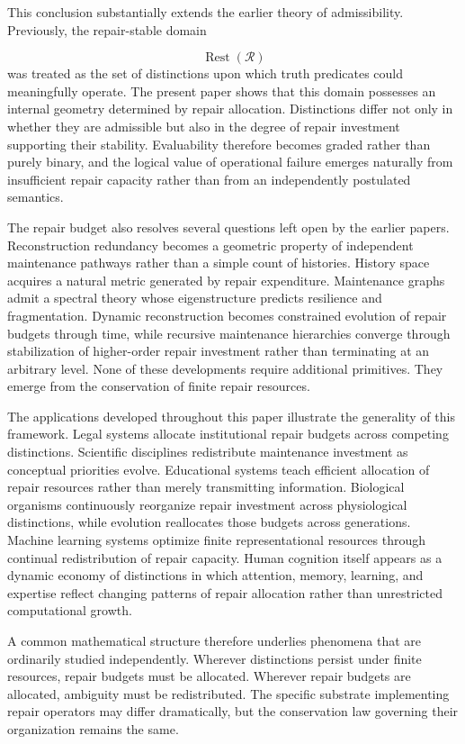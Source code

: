 \documentclass[12pt,oneside]{article}
\theoremstyle{plain}
\theoremstyle{definition}
\theoremstyle{remark}
\DeclareMathOperator{\Rest}{Rest}
\begin{document}
This conclusion substantially extends the earlier theory of admissibility. Previously, the repair-stable domain

\[
\Rest(\mathcal R)
\]
was treated as the set of distinctions upon which truth predicates could meaningfully operate. The present paper shows that this domain possesses an internal geometry determined by repair allocation. Distinctions differ not only in whether they are admissible but also in the degree of repair investment supporting their stability. Evaluability therefore becomes graded rather than purely binary, and the logical value of operational failure emerges naturally from insufficient repair capacity rather than from an independently postulated semantics.

The repair budget also resolves several questions left open by the earlier papers. Reconstruction redundancy becomes a geometric property of independent maintenance pathways rather than a simple count of histories. History space acquires a natural metric generated by repair expenditure. Maintenance graphs admit a spectral theory whose eigenstructure predicts resilience and fragmentation. Dynamic reconstruction becomes constrained evolution of repair budgets through time, while recursive maintenance hierarchies converge through stabilization of higher-order repair investment rather than terminating at an arbitrary level. None of these developments require additional primitives. They emerge from the conservation of finite repair resources.

The applications developed throughout this paper illustrate the generality of this framework. Legal systems allocate institutional repair budgets across competing distinctions. Scientific disciplines redistribute maintenance investment as conceptual priorities evolve. Educational systems teach efficient allocation of repair resources rather than merely transmitting information. Biological organisms continuously reorganize repair investment across physiological distinctions, while evolution reallocates those budgets across generations. Machine learning systems optimize finite representational resources through continual redistribution of repair capacity. Human cognition itself appears as a dynamic economy of distinctions in which attention, memory, learning, and expertise reflect changing patterns of repair allocation rather than unrestricted computational growth.

A common mathematical structure therefore underlies phenomena that are ordinarily studied independently. Wherever distinctions persist under finite resources, repair budgets must be allocated. Wherever repair budgets are allocated, ambiguity must be redistributed. The specific substrate implementing repair operators may differ dramatically, but the conservation law governing their organization remains the same.
\end{document}
